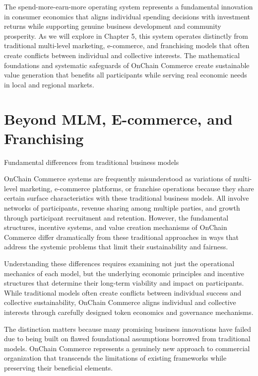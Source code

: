 \documentclass[
  Letterpaper,
]{scrbook}
\begin{document}
The spend-more-earn-more operating system represents a fundamental
innovation in consumer economics that aligns individual spending
decisions with investment returns while supporting genuine business
development and community prosperity. As we will explore in Chapter 5,
this system operates distinctly from traditional multi-level marketing,
e-commerce, and franchising models that often create conflicts between
individual and collective interests. The mathematical foundations and
systematic safeguards of OnChain Commerce create sustainable value
generation that benefits all participants while serving real economic
needs in local and regional markets.

\chapter{Beyond MLM, E-commerce, and
Franchising}\label{sec-beyond-traditional}

Fundamental differences from traditional business models

OnChain Commerce systems are frequently misunderstood as variations of
multi-level marketing, e-commerce platforms, or franchise operations
because they share certain surface characteristics with these
traditional business models. All involve networks of participants,
revenue sharing among multiple parties, and growth through participant
recruitment and retention. However, the fundamental structures,
incentive systems, and value creation mechanisms of OnChain Commerce
differ dramatically from these traditional approaches in ways that
address the systemic problems that limit their sustainability and
fairness.

Understanding these differences requires examining not just the
operational mechanics of each model, but the underlying economic
principles and incentive structures that determine their long-term
viability and impact on participants. While traditional models often
create conflicts between individual success and collective
sustainability, OnChain Commerce aligns individual and collective
interests through carefully designed token economics and governance
mechanisms.

The distinction matters because many promising business innovations have
failed due to being built on flawed foundational assumptions borrowed
from traditional models. OnChain Commerce represents a genuinely new
approach to commercial organization that transcends the limitations of
existing frameworks while preserving their beneficial elements.
\end{document}
